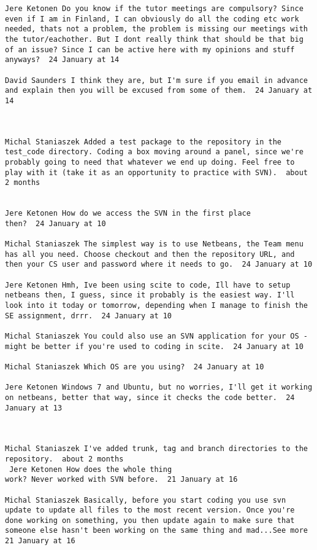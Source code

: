 \begin{verbatim}
Jere Ketonen Do you know if the tutor meetings are compulsory? Since
even if I am in Finland, I can obviously do all the coding etc work
needed, thats not a problem, the problem is missing our meetings with
the tutor/eachother. But I dont really think that should be that big
of an issue? Since I can be active here with my opinions and stuff
anyways?  24 January at 14

David Saunders I think they are, but I'm sure if you email in advance
and explain then you will be excused from some of them.  24 January at
14



Michal Staniaszek Added a test package to the repository in the
test_code directory. Coding a box moving around a panel, since we're
probably going to need that whatever we end up doing. Feel free to
play with it (take it as an opportunity to practice with SVN).  about
2 months 
 

Jere Ketonen How do we access the SVN in the first place
then?  24 January at 10

Michal Staniaszek The simplest way is to use Netbeans, the Team menu
has all you need. Choose checkout and then the repository URL, and
then your CS user and password where it needs to go.  24 January at 10

Jere Ketonen Hmh, Ive been using scite to code, Ill have to setup
netbeans then, I guess, since it probably is the easiest way. I'll
look into it today or tomorrow, depending when I manage to finish the
SE assignment, drrr.  24 January at 10

Michal Staniaszek You could also use an SVN application for your OS -
might be better if you're used to coding in scite.  24 January at 10

Michal Staniaszek Which OS are you using?  24 January at 10

Jere Ketonen Windows 7 and Ubuntu, but no worries, I'll get it working
on netbeans, better that way, since it checks the code better.  24
January at 13



Michal Staniaszek I've added trunk, tag and branch directories to the
repository.  about 2 months 
 Jere Ketonen How does the whole thing
work? Never worked with SVN before.  21 January at 16

Michal Staniaszek Basically, before you start coding you use svn
update to update all files to the most recent version. Once you're
done working on something, you then update again to make sure that
someone else hasn't been working on the same thing and mad...See more
21 January at 16




\end{verbatim}
